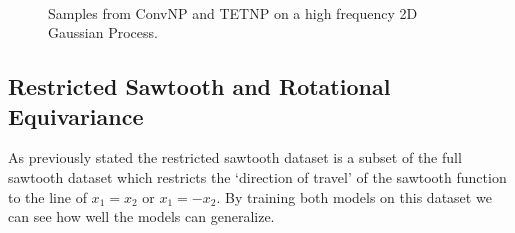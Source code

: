 \documentclass[../../main.tex]{subfiles}
\begin{document}
\begin{figure}[H]
	\centering
	\\
	\caption{Samples from ConvNP and TETNP on a high frequency 2D Gaussian Process.}
	\label{fig:high-freq-2d-gps}
\end{figure}

\subsection{Restricted Sawtooth and Rotational Equivariance}

As previously stated the restricted sawtooth dataset is a subset of the full sawtooth dataset which restricts the `direction of travel' of the sawtooth function to the line of $x_1 = x_2$ or $x_1 = -x_2$. By training both models on this dataset we can see how well the models can generalize.
\end{document}
